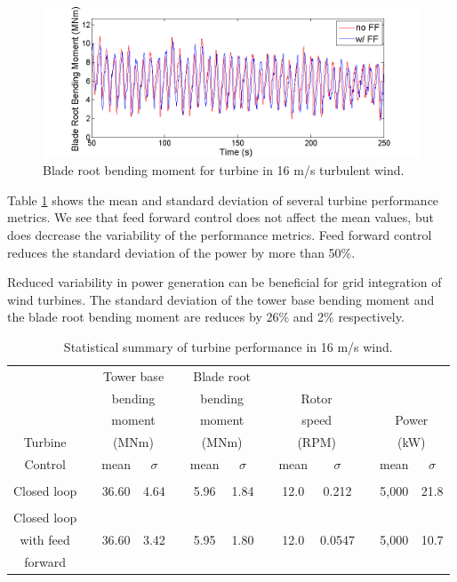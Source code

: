 \begin{figure}[htbp]
	\centering
		\includegraphics[width = \linewidth]{Figures/ch3Figures/fig3-23.png}
		
	\caption{Blade root bending moment for turbine in 16 m/s turbulent wind.}
	\label{fig3-23}
\end{figure}

Table \ref{Table3-2} shows the mean and standard deviation of several turbine performance metrics. We see that feed forward control does not affect the mean values, but does decrease the variability of the performance metrics. Feed forward control reduces the standard deviation of the power by more than 50$\%$. 

Reduced variability in power generation can be beneficial for grid integration of wind turbines. The standard deviation of the tower base bending moment and the blade root bending moment are reduces by 26$\%$ and 2$\%$ respectively. 

\begin{table}
\centering
\begin{tabular}{ c | c c c c c c c c c c c c}
\hline
\hline
	& & \multicolumn{2}{c}{Tower base}	& & \multicolumn{2}{c}{Blade root}		& & \\
	& & \multicolumn{2}{c}{bending}	& & \multicolumn{2}{c}{bending}		& &\multicolumn{2}{c}{Rotor}	& & \\
	& & \multicolumn{2}{c}{moment}	& & \multicolumn{2}{c}{moment}		& &\multicolumn{2}{c}{speed}		& &\multicolumn{2}{c}{Power} \\	
Turbine					& & \multicolumn{2}{c}{(MNm)}  					& & \multicolumn{2}{c}{(MNm)}	& & \multicolumn{2}{c}{(RPM)}	& & \multicolumn{2}{c}{(kW)}\\
\cline{3-4} \cline{6-7} \cline{9-10} \cline{12-13} 
Control & & mean & $\sigma$ & & mean & $\sigma$ & & mean & $\sigma$  & & mean & $\sigma$ \\
\hline
\\
Closed loop & & 36.60 & 4.64  & & 5.96 & 1.84  && 12.0 & 0.212&& 5,000  & 21.8 \\
 \\
Closed loop \\
with feed   & & 36.60 & 3.42  & & 5.95 & 1.80 && 12.0 & 0.0547  && 5,000  & 10.7 \\
forward\\
\hline
\hline
\end{tabular}
\caption{Statistical summary of turbine performance in 16 m/s wind.}
\label{Table3-2}
\end{table}


